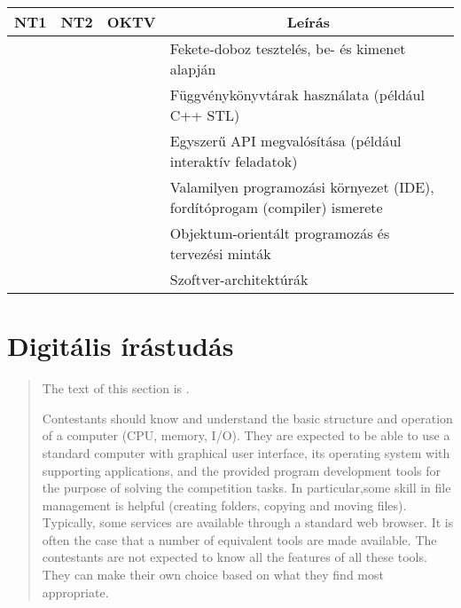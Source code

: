 \documentclass[a4paper,11pt,oneside]{article}
\newcommand{\cmark}{\ding{51}}%
\newcommand{\xmark}{\ding{55}}%
\newcommand{\ccode}{{\small\cmark\faFileText}}
\newcommand{\cemay}{{\small\xmark\faQuestionCircle}}
\newcommand{\cexcl}{{\small\xmark}}
\newcommand{\ctable}[1]{
    \begin{center}
        \begin{longtable}{ | C | C | C | m{8cm} | } %
        \hline
        \textbf{NT1} & \textbf{NT2} & \textbf{OKTV} & \multicolumn{1}{|c|}{\textbf{Leírás}} \\ \hline
        \endhead
        #1
        \end{longtable}
    \end{center}
}
\begin{document}
\ctable{
    \ccode & \ccode & \ccode & Fekete-doboz tesztelés, be- és kimenet alapján
    \\ \hline  %
    \ccode & \ccode & \ccode & Függvénykönyvtárak használata (például C++ STL)
    \\ \hline  %
    \cexcl & \cexcl & \cemay & Egyszerű API megvalósítása (például interaktív feladatok)
    \\ \hline  %
    \ccode & \ccode & \ccode & Valamilyen programozási környezet (IDE), fordítóprogam (compiler) ismerete
    \\ \hline  %
    \cexcl & \cexcl & \cexcl & Objektum-orientált programozás és tervezési minták
    \\ \hline  %
    \cexcl & \cexcl & \cexcl & Szoftver-architektúrák
    \\ \hline  %
    
}

\section {Digitális írástudás} %
\label{subsec:computer-literacy}

\begin{quote}
    The text of this section is \ccode .
    
    \medskip
    
    Contestants should know and understand the basic structure and operation of a computer
    (CPU, memory, I/O).
    They are expected to be able to use a standard computer with graphical user interface,
    its operating system with supporting applications, and the provided program development tools
    for the purpose of solving the competition tasks. In particular,some skill in file management
    is helpful (creating folders, copying and moving files).
    Typically, some services are available through a standard web browser.    
    It is often the case that a number of equivalent tools are made available.
    The contestants are not expected to know all the features of all these tools.
    They can make their own choice based on what they find most appropriate.
\end{quote}    
\end{document}
